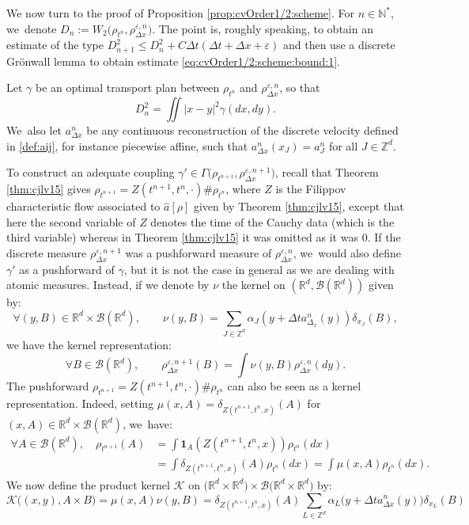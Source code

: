 \documentclass[11pt]{article}
\numberwithin{equation}{section}
\def\NN{\mathbb{N}}
\def\RR{\mathbb{R}}
\def\ZZ{\mathbb{Z}}
\def\eps{\varepsilon}
\def\dt{\Delta t}
\def\dx{\Delta x}
\def\calB{{\mathcal B}}
\def\achapo{\widehat{a}}
\theoremstyle{plain}
\theoremstyle{definition}
\begin{document}
We now turn to the proof of Proposition \ref{prop:cvOrder1/2:scheme}.
For $n \in \NN^*$, we~denote $D_n:= W_2 \bigl(\rho_{t^n},\rho_{\dx}^{\eps,n} \bigr)$. The point is, roughly speaking, to obtain an estimate of the type $D_{n+1}^2 \leq D_n^2 + C\dt(\dt + \dx + \eps)$ and then use a discrete Grönwall lemma to obtain estimate \eqref{eq:cvOrder1/2:scheme:bound:1}.

Let $\gamma$ be an optimal transport plan between $\rho_{t^n}$ and $\rho_{\dx}^{\eps,n}$, so that
\[
D_n^2 =\iint |x-y|^2 \gamma(dx,dy).
\]
We~also let $a^n_{\dx}$ be any continuous reconstruction of the discrete velocity defined in \eqref{def:aij}, for instance piecewise affine, such that $a_{\dx}^n(x_J) = a_J^n$ for all $J \in \ZZ^d$.

To construct an adequate coupling $\gamma' \in \Gamma\big(\rho_{t^{n+1}}, \rho_{\dx}^{\eps,n+1}\big)$, recall that Theorem \ref{thm:cjlv15} gives $\rho_{t^{n+1}} = Z(t^{n+1}, t^n, \cdot) \# \rho_{t^n}$, where $Z$ is the Filippov characteristic flow associated to $\achapo[\rho]$ given by Theorem \ref{thm:cjlv15}, except that here the second variable of $Z$ denotes the time of the Cauchy data (which is the third variable) whereas in Theorem \ref{thm:cjlv15} it was omitted as it was $0$. If the discrete measure $\rho_{\dx}^{\eps,n+1}$ was a pushforward measure of $\rho_{\dx}^{\eps,n}$, we~would also define $\gamma'$ as a pushforward of $\gamma$, but it is not the case in general as we are dealing with atomic measures. Instead, if we denote by $\nu$ the kernel on $(\RR^d, \calB(\RR^d))$ given by:
\[
\forall (y, B) \in \RR^d \times \calB(\RR^d), \qquad \nu(y, B) = \sum_{J \in \ZZ^d} \alpha_J(y + \dt a^n_{\Delta_x}(y)) \delta_{x_J}(B),
\]
we have the kernel representation:
\[
\forall B \in \calB(\RR^d), \qquad \rho_{\dx}^{\eps,n+1}(B) = \int \nu(y, B) \rho_{\dx}^{\eps,n}(dy).
\]
The pushforward $\rho_{t^{n+1}} = Z(t^{n+1}, t^n, \cdot) \# \rho_{t^n}$ can also be seen as a kernel representation. Indeed, setting $\mu(x, A) = \delta_{Z(t^{n+1}, t^n, x)}(A)$ for $(x,A) \in \RR^d \times \calB(\RR^d)$, we~have:
\begin{align*}
\forall A \in \calB(\RR^d), \quad \rho_{t^{n+1}}(A) &= \int {\mathbf 1}_{A}(Z(t^{n+1}, t^n, x)) \rho_{t^n} (dx) \\
&= \int \delta_{Z(t^{n+1}, t^n, x)}(A) \rho_{t^n} (dx) = \int \mu(x, A) \rho_{t^n} (dx).
\end{align*}
We now define the product kernel ${\mathcal K}$ on $\big(\RR^d \times \RR^d \big) \times \calB\big(\RR^d \times \RR^d \big)$ by:
\[
{\mathcal K} \bigl( (x,y), A \times B \bigr) = \mu(x,A) \nu(y,B) = \delta_{Z(t^{n+1}, t^n, x)}(A)
\sum_{L \in {\ZZ}^d} \alpha_{L}\bigl(y+\dt a^n_{\dx}(y) \bigr)
\delta_{x_L}(B)
\]
\end{document}
